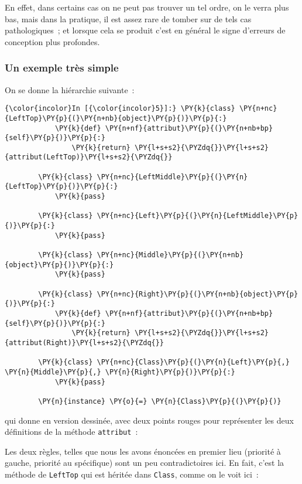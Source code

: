 En effet, dans certains cas on ne peut pas trouver un tel ordre, on le
verra plus bas, mais dans la pratique, il est assez rare de tomber sur
de tels cas pathologiques~; et lorsque cela se produit c'est en général
le signe d'erreurs de conception plus profondes.

    \hypertarget{un-exemple-truxe8s-simple}{%
\subsubsection{Un exemple très simple}\label{un-exemple-truxe8s-simple}}

    On se donne la hiérarchie suivante~:

    \begin{Verbatim}[commandchars=\\\{\},frame=single,framerule=0.3mm,rulecolor=\color{cellframecolor}]
{\color{incolor}In [{\color{incolor}5}]:} \PY{k}{class} \PY{n+nc}{LeftTop}\PY{p}{(}\PY{n+nb}{object}\PY{p}{)}\PY{p}{:}
            \PY{k}{def} \PY{n+nf}{attribut}\PY{p}{(}\PY{n+nb+bp}{self}\PY{p}{)}\PY{p}{:} 
                \PY{k}{return} \PY{l+s+s2}{\PYZdq{}}\PY{l+s+s2}{attribut(LeftTop)}\PY{l+s+s2}{\PYZdq{}}
            
        \PY{k}{class} \PY{n+nc}{LeftMiddle}\PY{p}{(}\PY{n}{LeftTop}\PY{p}{)}\PY{p}{:} 
            \PY{k}{pass}
        
        \PY{k}{class} \PY{n+nc}{Left}\PY{p}{(}\PY{n}{LeftMiddle}\PY{p}{)}\PY{p}{:} 
            \PY{k}{pass}
        
        \PY{k}{class} \PY{n+nc}{Middle}\PY{p}{(}\PY{n+nb}{object}\PY{p}{)}\PY{p}{:} 
            \PY{k}{pass}
        
        \PY{k}{class} \PY{n+nc}{Right}\PY{p}{(}\PY{n+nb}{object}\PY{p}{)}\PY{p}{:}
            \PY{k}{def} \PY{n+nf}{attribut}\PY{p}{(}\PY{n+nb+bp}{self}\PY{p}{)}\PY{p}{:} 
                \PY{k}{return} \PY{l+s+s2}{\PYZdq{}}\PY{l+s+s2}{attribut(Right)}\PY{l+s+s2}{\PYZdq{}}
        
        \PY{k}{class} \PY{n+nc}{Class}\PY{p}{(}\PY{n}{Left}\PY{p}{,} \PY{n}{Middle}\PY{p}{,} \PY{n}{Right}\PY{p}{)}\PY{p}{:} 
            \PY{k}{pass}
        
        \PY{n}{instance} \PY{o}{=} \PY{n}{Class}\PY{p}{(}\PY{p}{)}
\end{Verbatim}


    qui donne en version dessinée, avec deux points rouges pour représenter
les deux définitions de la méthode \texttt{attribut}~:

    Les deux règles, telles que nous les avons énoncées en premier lieu
(priorité à gauche, priorité au spécifique) sont un peu contradictoires
ici. En fait, c'est la méthode de \texttt{LeftTop} qui est héritée dans
\texttt{Class}, comme on le voit ici~:

